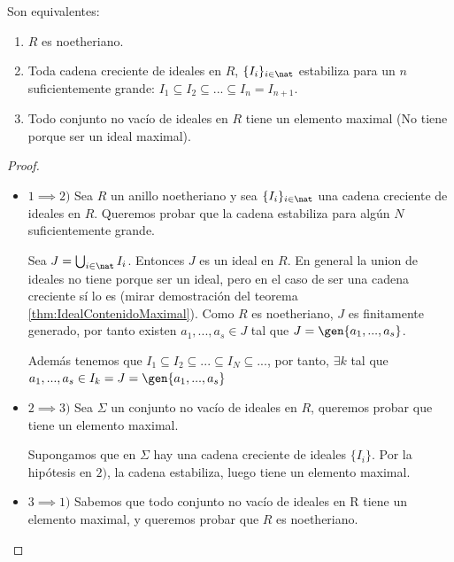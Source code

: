 \begin{prop}\label{prop:caracterizacion_noetheriano}
	Son equivalentes:
	\begin{enumerate}
		\item $R$ es noetheriano.
		\item Toda cadena creciente de ideales en $R$, $\{I_i\}_{i \in \nat}$ estabiliza para un $n$ suficientemente grande: $I_1 \subseteq I_2 \subseteq ... \subseteq I_n = I_{n+1}$.
		\item Todo conjunto no vacío de ideales en $R$ tiene un elemento maximal (No tiene porque ser un ideal maximal).
	\end{enumerate}
\end{prop}

\begin{proof}
	\begin{itemize}
		\item $1 \implies 2)$ Sea $R$ un anillo noetheriano y sea $\{I_i\}_{i \in \nat}$ una cadena creciente de ideales en $R$. Queremos probar que la cadena estabiliza para algún $N$ suficientemente grande.
		
		Sea $J= \bigcup_{i \in \nat} I_i$. Entonces $J$  es un ideal en $R$. En general la union de ideales no tiene porque ser un ideal, pero en el caso de ser una cadena creciente sí lo es (mirar demostración del teorema \ref{thm:IdealContenidoMaximal}). Como $R$ es noetheriano, $J$ es finitamente generado, por tanto existen $a_1,...,a_s \in J$ tal que $J=\gen{a_1,...,a_s}$.
		
		Además tenemos que $I_1 \subseteq I_2 \subseteq ... \subseteq I_N \subseteq ...$, por tanto, $\exists k$ tal que  $a_1,...,a_s \in I_k = J = \gen{a_1,...,a_s}$
		
		\item $2 \implies 3)$ Sea $\Sigma$ un conjunto no vacío de ideales en $R$, queremos probar que tiene un elemento maximal. 
		
		Supongamos que en $\Sigma$ hay una cadena creciente de ideales $\{I_i\}$. Por la hipótesis en $2)$, la cadena estabiliza, luego tiene un elemento maximal.
		
		\item $3 \implies 1)$ Sabemos que todo conjunto no vacío de ideales en R tiene un elemento maximal, y queremos probar que $R$ es noetheriano. 
		

\end{itemize}
\end{proof}
